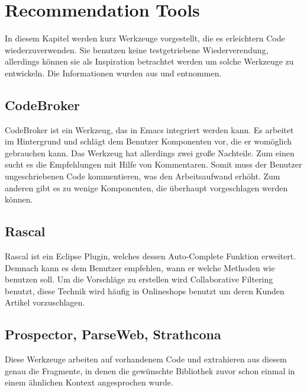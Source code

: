 \chapter{Recommendation Tools}
In diesem Kapitel werden kurz Werkzeuge vorgestellt, die es erleichtern Code wiederzuverwenden. Sie benutzen keine testgetriebene Wiederverendung, allerdings können sie als Inspiration betrachtet werden um solche Werkzeuge zu entwickeln. Die Informationen wurden aus \autocite{OS5/2011} und \autocite{Hum08} entnommen.

\section{CodeBroker}
CodeBroker ist ein Werkzeug, das in Emacs integriert werden kann. Es arbeitet im Hintergrund und schlägt dem Benutzer Komponenten vor, die er womöglich gebrauchen kann. Das Werkzeug hat allerdings zwei große Nachteile. Zum einen sucht es die Empfehlungen mit Hilfe von Kommentaren. Somit muss der Benutzer ungeschriebenen Code kommentieren, was den Arbeitsaufwand erhöht. Zum anderen gibt es zu wenige Komponenten, die überhaupt vorgeschlagen werden können.

\section{Rascal}
Rascal ist ein Eclipse Plugin, welches dessen Auto-Complete Funktion erweitert. Demnach kann es dem Benutzer empfehlen, wann er welche Methoden wie benutzen soll. Um die Vorschläge zu erstellen wird Collaborative Filtering benutzt, diese Technik wird häufig in Onlineshops benutzt um deren Kunden Artikel vorzuschlagen.

\section{Prospector, ParseWeb, Strathcona}
Diese Werkzeuge arbeiten auf vorhandenem Code und extrahieren aus diesem genau die Fragmente, in denen die gewünschte Bibliothek zuvor schon einmal in einem ähnlichen Kontext angesprochen wurde.
